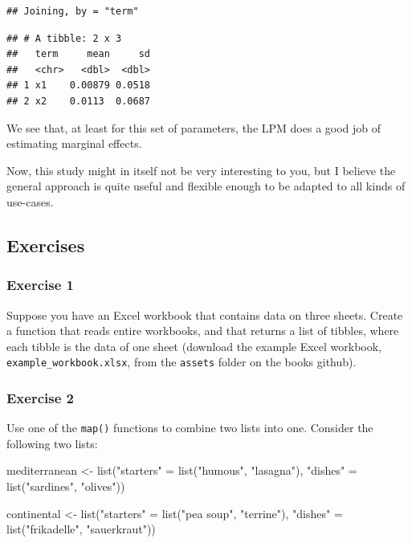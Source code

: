 \documentclass[
]{article}
\newenvironment{Shaded}{\begin{snugshade}}{\end{snugshade}}
\newcommand{\FunctionTok}[1]{\textcolor[rgb]{0.00,0.00,0.00}{#1}}
\newcommand{\NormalTok}[1]{#1}
\newcommand{\OtherTok}[1]{\textcolor[rgb]{0.56,0.35,0.01}{#1}}
\newcommand{\StringTok}[1]{\textcolor[rgb]{0.31,0.60,0.02}{#1}}
\begin{document}
\begin{verbatim}
## Joining, by = "term"
\end{verbatim}

\begin{verbatim}
## # A tibble: 2 x 3
##   term     mean     sd
##   <chr>   <dbl>  <dbl>
## 1 x1    0.00879 0.0518
## 2 x2    0.0113  0.0687
\end{verbatim}

We see that, at least for this set of parameters, the LPM does a good job of estimating marginal
effects.

Now, this study might in itself not be very interesting to you, but I believe the general approach
is quite useful and flexible enough to be adapted to all kinds of use-cases.

\hypertarget{exercises-6}{%
\subsection{Exercises}\label{exercises-6}}

\hypertarget{exercise-1-6}{%
\subsubsection*{Exercise 1}\label{exercise-1-6}}

Suppose you have an Excel workbook that contains data on three sheets. Create a function that
reads entire workbooks, and that returns a list of tibbles, where each tibble is the data of one
sheet (download the example Excel workbook, \texttt{example\_workbook.xlsx}, from the \texttt{assets} folder on
the books github).

\hypertarget{exercise-2-4}{%
\subsubsection*{Exercise 2}\label{exercise-2-4}}

Use one of the \texttt{map()} functions to combine two lists into one. Consider the following two lists:

\begin{Shaded}
\begin{Highlighting}[]
\NormalTok{mediterranean }\OtherTok{\textless{}{-}} \FunctionTok{list}\NormalTok{(}\StringTok{"starters"} \OtherTok{=} \FunctionTok{list}\NormalTok{(}\StringTok{"humous"}\NormalTok{, }\StringTok{"lasagna"}\NormalTok{), }\StringTok{"dishes"} \OtherTok{=} \FunctionTok{list}\NormalTok{(}\StringTok{"sardines"}\NormalTok{, }\StringTok{"olives"}\NormalTok{))}

\NormalTok{continental }\OtherTok{\textless{}{-}} \FunctionTok{list}\NormalTok{(}\StringTok{"starters"} \OtherTok{=} \FunctionTok{list}\NormalTok{(}\StringTok{"pea soup"}\NormalTok{, }\StringTok{"terrine"}\NormalTok{), }\StringTok{"dishes"} \OtherTok{=} \FunctionTok{list}\NormalTok{(}\StringTok{"frikadelle"}\NormalTok{, }\StringTok{"sauerkraut"}\NormalTok{))}
\end{Highlighting}
\end{Shaded}
\end{document}
